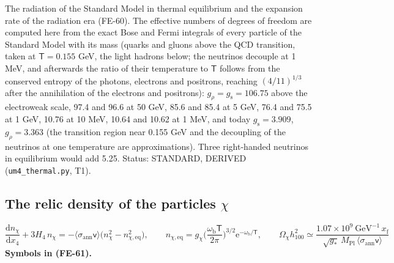 \documentclass[
  10pt,
]{article}
\begin{document}
The radiation of the Standard Model in thermal equilibrium and the
expansion rate of the radiation era (FE-60). The effective numbers of
degrees of freedom are computed here from the exact Bose and Fermi
integrals of every particle of the Standard Model with its mass (quarks
and gluons above the QCD transition, taken at \(\mathsf{T} = 0.155\)
GeV, the light hadrons below; the neutrinos decouple at 1 MeV, and
afterwards the ratio of their temperature to \(\mathsf{T}\) follows from
the conserved entropy of the photons, electrons and positrons, reaching
\((4/11)^{1/3}\) after the annihilation of the electrons and positrons):
\(g_\rho = g_{\mathrm{s}} = 106.75\) above the electroweak scale, 97.4
and 96.6 at 50 GeV, 85.6 and 85.4 at 5 GeV, 76.4 and 75.5 at 1 GeV,
10.76 at 10 MeV, 10.64 and 10.62 at 1 MeV, and today
\(g_{\mathrm{s}} = 3.909\), \(g_\rho = 3.363\) (the transition region
near 0.155 GeV and the decoupling of the neutrinos at one temperature
are approximations). Three right-handed neutrinos in equilibrium would
add 5.25. Status: STANDARD, DERIVED (\texttt{um4\_thermal.py}, T1).

\hypertarget{the-relic-density-of-the-particles-chi}{%
\subsection{\texorpdfstring{The relic density of the particles
\(\chi\)}{The relic density of the particles \textbackslash chi}}\label{the-relic-density-of-the-particles-chi}}

\[
\frac{\mathrm{d}n_\chi}{\mathrm{d}x_4} + 3H_4\,n_\chi = -\langle\sigma_{\mathrm{ann}}\mathsf{v}\rangle\big(n_\chi^2 - n_{\chi,\mathrm{eq}}^2\big),\qquad
n_{\chi,\mathrm{eq}} = g_\chi\Big(\frac{\omega_{\mathrm{b}}\mathsf{T}}{2\pi}\Big)^{3/2}\mathrm{e}^{-\omega_{\mathrm{b}}/\mathsf{T}},\qquad
\Omega_\chi h_{100}^2 \simeq \frac{1.07\times10^9\ \text{GeV}^{-1}\,x_{\mathrm{f}}}{\sqrt{g_*}\,M_{\mathrm{Pl}}\,\langle\sigma_{\mathrm{ann}}\mathsf{v}\rangle} \tag{FE-61}
\] \textbf{Symbols in (FE-61).}
\end{document}
